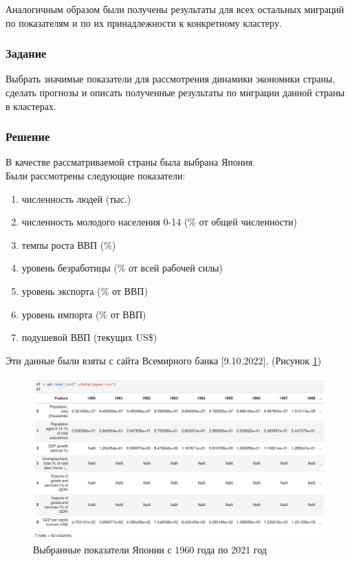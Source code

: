 \documentclass[14pt,fleqn]{extarticle}
\begin{document}
	Аналогичным образом были получены результаты для всех остальных миграций по показателям и по их принадлежности к конкретному кластеру.
	
	\newpage
	
	\subsubsection*{Задание}
	
	Выбрать значимые показатели для рассмотрения динамики экономики страны, сделать прогнозы и описать полученные результаты по миграции данной страны в кластерах.
	
	\subsubsection*{Решение}
	
	В качестве рассматриваемой страны была выбрана Япония.\\
	
	Были рассмотрены следующие показатели:
	\begin{enumerate}[topsep=0pt,itemsep=-1ex,partopsep=1ex,parsep=1ex]
		\item численность людей (тыс.)
		\item численность молодого населения 0-14 (\% от общей численности)
		\item темпы роста ВВП (\%)
		\item уровень безработицы (\% от всей рабочей силы)
		\item уровень экспорта (\% от ВВП)
		\item уровень импорта (\% от ВВП)
		\item подушевой ВВП (текущих US\$)\\
	\end{enumerate}

	Эти данные были взяты с сайта Всемирного банка [9.10.2022]. (Рисунок \ref{fig:japan_data})
	
	\begin{figure}[h]
		\centering \includegraphics[scale=0.45]{japan_data}
		\caption{Выбранные показатели Японии с 1960 года по 2021 год}
		\label{fig:japan_data}
	\end{figure}
\end{document}
